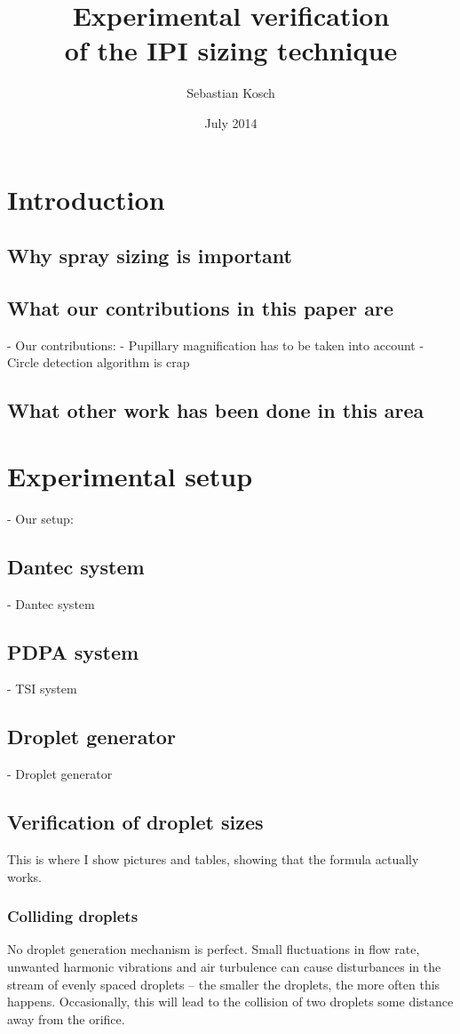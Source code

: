 \documentclass[10pt]{book}
\begin{document}
\title{Experimental verification\\ of the IPI sizing technique}
\author{Sebastian Kosch}
\date{July 2014}
\maketitle

\printnomenclature[5em]

\chapter{Introduction}
\section{Why spray sizing is important}
\section{What our contributions in this paper are}
- Our contributions:
    - Pupillary magnification has to be taken into account
    - Circle detection algorithm is crap
\section{What other work has been done in this area}

\chapter{Experimental setup}
- Our setup:
\section{Dantec system}
    - Dantec system
\section{PDPA system}
    - TSI system
\section{Droplet generator}
\label{sec:droplet-generator}
    - Droplet generator
\section{Verification of droplet sizes}
This is where I show pictures and tables, showing that the formula
actually works.

\subsection{Colliding droplets}
\label{sec:droplet-collisions}
No droplet generation mechanism is perfect. Small fluctuations in flow rate,
unwanted harmonic vibrations and air turbulence can cause disturbances in the
stream of evenly spaced droplets -- the smaller the droplets, the more often
this happens. Occasionally, this will lead to the collision
of two droplets some distance away from the orifice.
\end{document}
